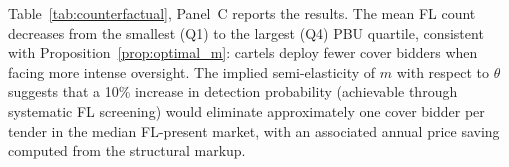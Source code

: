 Table~\ref{tab:counterfactual}, Panel~C reports the results. The mean
FL count decreases from the smallest (Q1) to the largest (Q4) PBU
quartile, consistent with Proposition~\ref{prop:optimal_m}: cartels
deploy fewer cover bidders when facing more intense oversight. The
implied semi-elasticity of $m$ with respect to $\theta$ suggests that
a 10\% increase in detection probability (achievable through
systematic FL screening) would eliminate approximately one cover
bidder per tender in the median FL-present market, with an associated
annual price saving computed from the structural markup.


